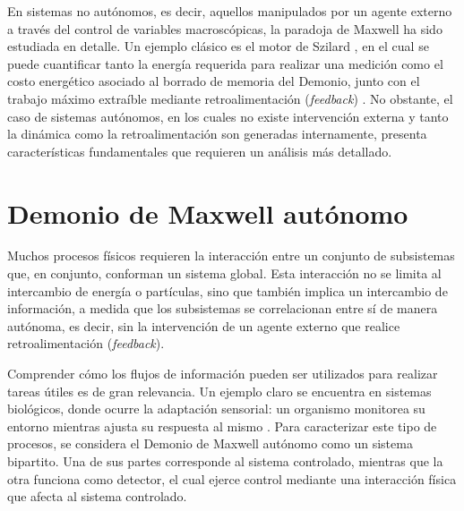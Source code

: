 En sistemas no autónomos, es decir, aquellos manipulados por un agente externo a través del control de variables macroscópicas, la paradoja de Maxwell ha sido estudiada en detalle. Un ejemplo clásico es el motor de Szilard \cite{szilard1964decrease}, en el cual se puede cuantificar tanto la energía requerida para realizar una medición como el costo energético asociado al borrado de memoria del Demonio, junto con el trabajo máximo extraíble mediante retroalimentación (\textit{feedback}) \cite{maruyama2009colloquium, sagawa2008second}. No obstante, el caso de sistemas autónomos, en los cuales no existe intervención externa y tanto la dinámica como la retroalimentación son generadas internamente, presenta características fundamentales que requieren un análisis más detallado.


\label{sec4:Demon}

\section{Demonio de Maxwell autónomo}

Muchos procesos físicos requieren la interacción entre un conjunto de subsistemas que, en conjunto, conforman un sistema global. Esta interacción no se limita al intercambio de energía o partículas, sino que también implica un intercambio de información, a medida que los subsistemas se correlacionan entre sí de manera autónoma, es decir, sin la intervención de un agente externo que realice retroalimentación (\textit{feedback}). 

Comprender cómo los flujos de información pueden ser utilizados para realizar tareas útiles es de gran relevancia. Un ejemplo claro se encuentra en sistemas biológicos, donde ocurre la adaptación sensorial: un organismo monitorea su entorno mientras ajusta su respuesta al mismo \cite{lan2012energy}. Para caracterizar este tipo de procesos, se considera el Demonio de Maxwell autónomo como un sistema bipartito. Una de sus partes corresponde al sistema controlado, mientras que la otra funciona como detector, el cual ejerce control mediante una interacción física que afecta al sistema controlado. 

